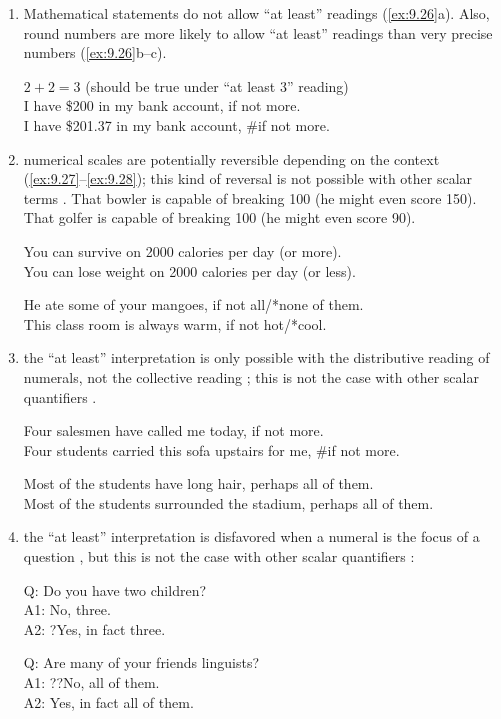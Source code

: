 \begin{enumerate}
\item Mathematical statements do not allow “at least” readings (\ref{ex:9.26}a). Also, round numbers are more likely to allow “at least” readings than very precise numbers (\ref{ex:9.26}b--c).

\ea \label{ex:9.26}
\ea * $2+2=3$ (should be true under “at least 3” reading)\\
\ex I have \$200 in my bank account, if not more.\\
\ex I have \$201.37 in my bank account, \#if not more.
                       \z
\z
 
\item numerical scales are potentially reversible depending on the context (\ref{ex:9.27}--\ref{ex:9.28}); this kind of reversal is not possible with other scalar terms .
\ea \label{ex:9.27}
\ea That bowler is capable of breaking 100 (he might even score 150).\\
\ex That golfer is capable of breaking 100 (he might even score 90).
                       \z
\z

\ea \label{ex:9.28}
\ea You can survive on 2000 calories per day (or more).\\
\ex You can lose weight on 2000 calories per day (or less).
                       \z
\z

\ea \label{ex:9.29}
\ea He ate some of your mangoes, if not all/*none of them.\\
\ex This class room is always warm, if not hot/*cool.
                       \z
\z

\item the “at least” interpretation is only possible with the distributive reading of numerals, not the collective reading ; this is not the case with other scalar quantifiers .

\ea \label{ex:9.30}
\ea Four salesmen have called me today, if not more.\\
\ex Four students carried this sofa upstairs for me, \#if not more.
                       \z
\z

\ea \label{ex:9.31}
\ea Most of the students have long hair, perhaps all of them.\\
\ex Most of the students surrounded the stadium, perhaps all of them.
                       \z
\z

\item the “at least” interpretation is disfavored when a numeral is the focus of a question , but this is not the case with other scalar quantifiers :

\ea \label{ex:9.32}
Q: Do you have two children?\\
A1: No, three.\\
A2: ?Yes, in fact three.
\z

\ea \label{ex:9.33}
Q: Are many of your friends linguists?\\
A1: ??No, all of them.\\
A2: Yes, in fact all of them.
\z
\end{enumerate}



